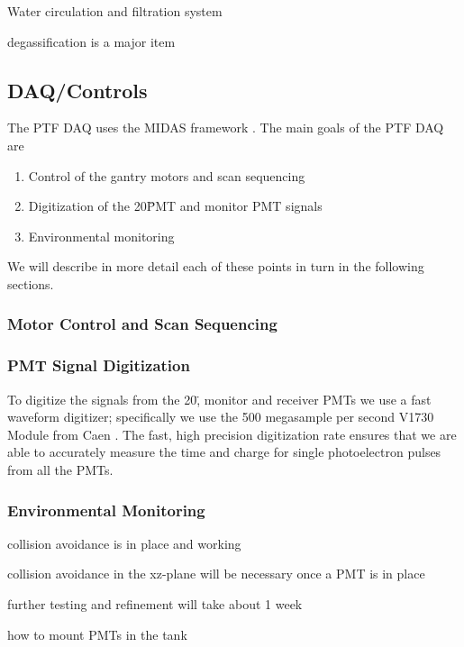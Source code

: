 Water circulation and filtration system

degassification is a major item


\subsection{DAQ/Controls}
\label{Sec:DAQ_Controls}

The PTF DAQ uses the MIDAS framework \cite{MIDASRef}.  The main goals of the PTF DAQ are

\begin{enumerate}
\item Control of the gantry motors and scan sequencing
\item Digitization of the 20\" PMT and monitor PMT signals 
\item Environmental monitoring
\end{enumerate}

We will describe in more detail each of these points in turn in the following sections.

\subsubsection{Motor Control and Scan Sequencing}


\subsubsection{PMT Signal Digitization}

To digitize the signals from the 20\", monitor and receiver PMTs we use a fast waveform digitizer; specifically
we use the 500 megasample per second V1730 Module from Caen \cite{V1730Ref}.  The fast, high precision digitization rate ensures that we
are able to accurately measure the time and charge for single photoelectron pulses from all the PMTs.


\subsubsection{Environmental Monitoring}




collision avoidance is in place and working

collision avoidance in the xz-plane will be necessary once a PMT is in place

further testing and refinement will take about 1 week

how to mount PMTs in the tank




